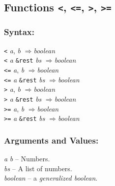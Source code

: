 \documentclass[10pt,fleqn]{article}
\newcommand{\code}[1]{\texttt{#1}}
\newcommand{\clieeeterm}[1]{\textit{#1}}
\newcommand{\varname}[1]{\textit{#1}}
\newcommand{\clterm}[1]{\textit{#1}}
\newcommand{\RArrow}{$\Rightarrow$}
\newcommand{\DDictionaryItem}[1]{\vspace*{6pt}\noindent\hrulefill\vspace*{-9pt}\subsection*{#1}}
\newcommand{\DSyntax}{\subsubsection*{Syntax:}}
\newcommand{\DArgsNValues}{\subsubsection*{Arguments and Values:}}
\newcommand{\DExceptional}{\subsubsection*{Exceptional Situations:}}
\begin{document}






\DDictionaryItem{Functions \code{<}, \code{<=}, \code{>}, \code{>=}}
\index{*!\code{<}}
\index{*!\code{<=}}
\index{*!\code{>}}
\index{*!\code{>=}}

\DSyntax{}

\code{<} \varname{a}, \varname{b} \RArrow \varname{boolean}\\
\code{<} \varname{a} \code{\&rest} \varname{bs} \RArrow \varname{boolean}\\
\code{<=} \varname{a}, \varname{b} \RArrow \varname{boolean}\\
\code{<=} \varname{a} \code{\&rest} \varname{bs} \RArrow \varname{boolean}\\
\code{>} \varname{a}, \varname{b} \RArrow \varname{boolean}\\
\code{>} \varname{a} \code{\&rest} \varname{bs} \RArrow \varname{boolean}\\
\code{>=} \varname{a}, \varname{b} \RArrow \varname{boolean}\\
\code{>=} \varname{a} \code{\&rest} \varname{bs} \RArrow \varname{boolean}

\DArgsNValues{}

\varname{a} \varname{b} -- Numbers.\\
\varname{bs} -- A list of numbers.\\
\varname{boolean} -- a \clterm{generalized boolean}.
\end{document}
